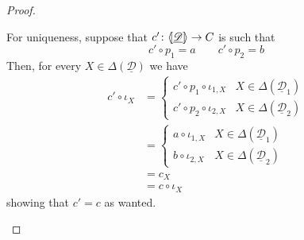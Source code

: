 \documentclass[a4paper]{article}
\newcommand{\dder}[1]{\mathscr{#1}}
\newcommand{\der}[1]{\underline{\dder{#1}}}
\newcommand{\lpro}{\langle \hspace{-1.85pt}[}
\newcommand{\rpro}{]\hspace{-1.85pt}\rangle}
\newcommand{\tpro}[1]{\lpro \der{#1}\rpro}
\theoremstyle{definition}
\begin{document}
\begin{proof}
\begin{enumerate}
	For uniqueness, suppose that $c'\colon \tpro{D}\to C$ is such that
	\[c'\circ p_1=a \qquad c'\circ p_2 = b\]
Then, for every $X\in \Delta(\der{D})$ we have
\begin{align*}
	c'\circ \iota_X &= \begin{cases}
	c'\circ p_1\circ \iota_{1, X} & X\in \Delta(\der{D}_1)\\
	c'\circ p_2\circ \iota_{2, X} & X\in \Delta(\der{D}_2)
	\end{cases}\\&=\begin{cases}
a\circ \iota_{1, X} & X\in \Delta(\der{D}_1)\\
b\circ \iota_{2, X} & X\in \Delta(\der{D}_2)
	\end{cases}\\&=c_X\\&=c\circ \iota_X
\end{align*}
showing that $c'=c$ as wanted.	 \qedhere 
	\end{enumerate}
\end{proof}
\end{document}
